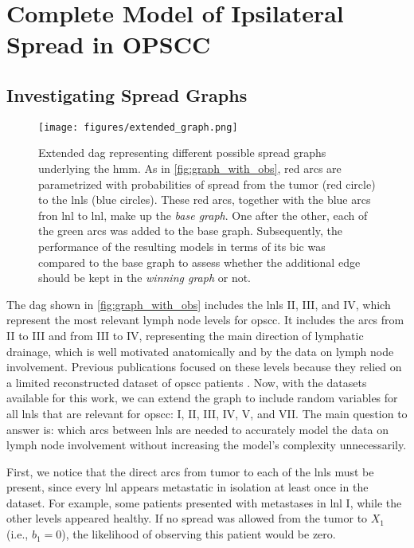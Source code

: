 \documentclass[twocolumn]{aastex631}
\begin{document}
\section{Complete Model of Ipsilateral Spread in OPSCC}
\label{sec:complete_model}


\subsection{Investigating Spread Graphs}
\label{subsec:complete_model:graphs}

\begin{figure}
    \centering
    \texttt{[image: figures/extended\_graph.png]}
    \caption{Extended \gls{dag} representing different possible spread graphs underlying the \gls{hmm}. As in \cref{fig:graph_with_obs}, red arcs are parametrized with probabilities of spread from the tumor (red circle) to the \glspl{lnl} (blue circles). These red arcs, together with the blue arcs fron \gls{lnl} to \gls{lnl}, make up the \emph{base graph}. One after the other, each of the green arcs was added to the base graph. Subsequently, the performance of the resulting models in terms of its \gls{bic} was compared to the base graph to assess whether the additional edge should be kept in the \emph{winning graph} or not.}
    \label{fig:extended_graph}
\end{figure}

The \gls{dag} shown in \cref{fig:graph_with_obs} includes the \glspl{lnl} II, III, and IV, which represent the most relevant lymph node levels for \gls{opscc}. It includes the arcs from II to III and from III to IV, representing the main direction of lymphatic drainage, which is well motivated anatomically and by the data on lymph node involvement. Previous publications  \cite{pouymayou_bayesian_2019,ludwig_hidden_2021} focused on these levels because they relied on a limited reconstructed dataset of \gls{opscc} patients \cite{sanguineti_defining_2009}. Now, with the datasets available for this work, we can extend the graph to include random variables for all \glspl{lnl} that are relevant for \gls{opscc}: I, II, III, IV, V, and VII. The main question to answer is: which arcs between \glspl{lnl} are needed to accurately model the data on lymph node involvement without increasing the model's complexity unnecessarily.

First, we notice that the direct arcs from tumor to each of the \glspl{lnl} must be present, since every \gls{lnl} appears metastatic in isolation at least once in the dataset. For example, some patients presented with metastases in \gls{lnl} I, while the other levels appeared healthy. If no spread was allowed from the tumor to $X_1$ (i.e., $b_1 = 0$), the likelihood of observing this patient would be zero.
\end{document}
